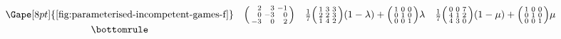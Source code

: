 \[\begin{array}{ c c c c }
    \Gape[8pt]{\text{\autoref{fig:parameterised-incompetent-games-f}}} &
        \begin{psmallmatrix*}[r] 
            2 & 3 & -1 \\
            0 & -3 & 0 \\
            -3 & 0 & 2 \\
        \end{psmallmatrix*} &
        \frac{1}{7}
        \begin{psmallmatrix}
            1 & 3 & 3 \\
            2 & 2 & 3 \\
            1 & 4 & 2 \\
        \end{psmallmatrix}
        (1 - \lambda) +
        \begin{psmallmatrix}
            1 & 0 & 0 \\
            0 & 1 & 0 \\
            0 & 0 & 1 \\
        \end{psmallmatrix}
        \lambda &
        \frac{1}{7}
        \begin{psmallmatrix}
            0 & 0 & 7 \\
            4 & 1 & 2 \\
            4 & 3 & 0 \\
        \end{psmallmatrix}
        (1 - \mu) +
        \begin{psmallmatrix}
            1 & 0 & 0 \\
            0 & 1 & 0 \\
            0 & 0 & 1 \\
        \end{psmallmatrix}
        \mu \\ \bottomrule
\end{array}
\]

\renewcommand{\tabcolsep}{6pt}
